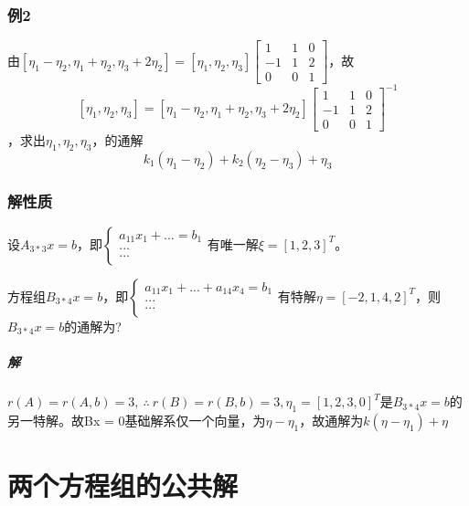 \subsubsection{例2}
由\([\eta_1 - \eta_2, \eta_1 + \eta_2, \eta_3 + 2\eta_2] = [\eta_1, \eta_2, \eta_3]\begin{bmatrix}
1 & 1 & 0 \\ 
-1 & 1 & 2 \\ 
0 & 0 & 1
\end{bmatrix}\)，故\[[\eta_1, \eta_2, \eta_3] = [\eta_1 - \eta_2, \eta_1 + \eta_2, \eta_3 + 2\eta_2]\begin{bmatrix}
1 & 1 & 0 \\ 
-1 & 1 & 2 \\ 
0 & 0 & 1
\end{bmatrix}^{-1}\]，求出\(\eta_1, \eta_2, \eta_3\)，的通解\[k_1(\eta_1 - \eta_2) + k_2(\eta_2 - \eta_3) + \eta_3\]


\subsubsection{解性质}
设\(A_{3 * 3}x = b\)，即\(\begin{cases}
    a_{11}x_1 + ... = b_1 \\ 
    ... \\ 
    ... \\ 
\end{cases}\)有唯一解\(\xi = [1, 2, 3]^T\)。

方程组\(B_{3 * 4}x = b\)，即\(\begin{cases}
    a_{11}x_1 + ... + a_{14}x_4 = b_1 \\ 
    ... \\ 
    ... \\ 
\end{cases}\)有特解\(\eta = [-2, 1, 4, 2]^T\)，则\(B_{3 * 4}x = b\)的通解为?

\subparagraph{解}
\(r(A) = r(A, b) = 3,\ \therefore\ r(B) = r(B, b) = 3, \eta_1 = [1, 2, 3, 0]^T\)是\(B_{3 * 4}x = b\)的另一特解。故Bx = 0基础解系仅一个向量，为\(\eta - \eta_1\)，故通解为\(k(\eta - \eta_1) + \eta\)



\section{两个方程组的公共解}

